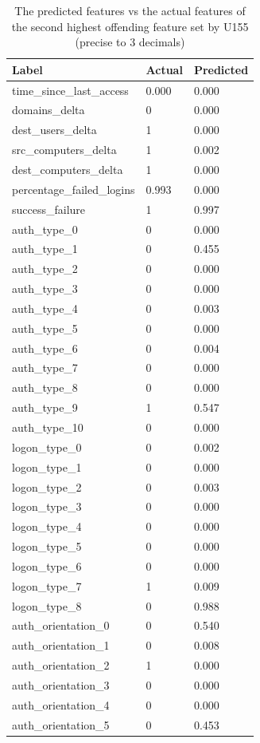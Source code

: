 \begin{table}[htbp]
	\centering
	\caption{The predicted features vs the actual features of the second highest offending feature set by U155 (precise to 3 decimals)}\label{tab:predicted_vs_actual_second}
	\begin{tabular}{lll}
		Label & Actual & Predicted \\ \midrule
		time\_since\_last\_access & 0.000 & 0.000 \\
		domains\_delta & 0 & 0.000 \\
		dest\_users\_delta & 1 & 0.000 \\
		src\_computers\_delta & 1 & 0.002 \\
		dest\_computers\_delta & 1 & 0.000 \\
		percentage\_failed\_logins & 0.993 & 0.000 \\
		success\_failure & 1 & 0.997 \\
		auth\_type\_0 & 0 & 0.000 \\
		auth\_type\_1 & 0 & 0.455 \\
		auth\_type\_2 & 0 & 0.000 \\
		auth\_type\_3 & 0 & 0.000 \\
		auth\_type\_4 & 0 & 0.003 \\
		auth\_type\_5 & 0 & 0.000 \\
		auth\_type\_6 & 0 & 0.004 \\
		auth\_type\_7 & 0 & 0.000 \\
		auth\_type\_8 & 0 & 0.000 \\
		auth\_type\_9 & 1 & 0.547 \\
		auth\_type\_10 & 0 & 0.000 \\
		logon\_type\_0 & 0 & 0.002 \\
		logon\_type\_1 & 0 & 0.000 \\
		logon\_type\_2 & 0 & 0.003 \\
		logon\_type\_3 & 0 & 0.000 \\
		logon\_type\_4 & 0 & 0.000 \\
		logon\_type\_5 & 0 & 0.000 \\
		logon\_type\_6 & 0 & 0.000 \\
		logon\_type\_7 & 1 & 0.009 \\
		logon\_type\_8 & 0 & 0.988 \\
		auth\_orientation\_0 & 0 & 0.540 \\
		auth\_orientation\_1 & 0 & 0.008 \\
		auth\_orientation\_2 & 1 & 0.000 \\
		auth\_orientation\_3 & 0 & 0.000 \\
		auth\_orientation\_4 & 0 & 0.000 \\
		auth\_orientation\_5 & 0 & 0.453
	\end{tabular}
\end{table}

